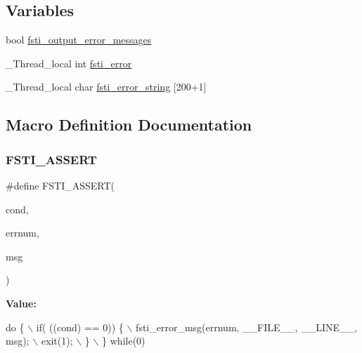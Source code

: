 \subsection*{Variables}
\begin{DoxyCompactItemize}
\item 
bool \mbox{\hyperlink{fsti-error_8h_aa816d4518d32fccf93d6989309eefa04}{fsti\+\_\+output\+\_\+error\+\_\+messages}}
\item 
\+\_\+\+Thread\+\_\+local int \mbox{\hyperlink{fsti-error_8h_a2fa89546149e592da51f9cd5324ddb1a}{fsti\+\_\+error}}
\item 
\+\_\+\+Thread\+\_\+local char \mbox{\hyperlink{fsti-error_8h_a99f70ec33b72be8e72a89fc904bcdb36}{fsti\+\_\+error\+\_\+string}} \mbox{[}200+1\mbox{]}
\end{DoxyCompactItemize}


\subsection{Macro Definition Documentation}
\mbox{\label{fsti-error_8h_a45677a0c04d632802de437b7a4cdec01}} 
\subsubsection{\texorpdfstring{F\+S\+T\+I\+\_\+\+A\+S\+S\+E\+RT}{FSTI\_ASSERT}}
{\footnotesize\ttfamily \#define F\+S\+T\+I\+\_\+\+A\+S\+S\+E\+RT(\begin{DoxyParamCaption}\item[{}]{cond,  }\item[{}]{errnum,  }\item[{}]{msg }\end{DoxyParamCaption})}

{\bfseries Value\+:}
\begin{DoxyCode}
\textcolor{keywordflow}{do} \{                                                                \(\backslash\)
        if( ((cond) == 0)) \{                                            \(\backslash\)
            fsti\_error\_msg(errnum, \_\_FILE\_\_, \_\_LINE\_\_, msg);            \(\backslash\)
            exit(1);                                                    \(\backslash\)
        \}                                                               \(\backslash\)
    \} \textcolor{keywordflow}{while}(0)
\end{DoxyCode}
\mbox{\label{fsti-error_8h_a1fd6db22083510e321de2ac2f1a14def}} 
